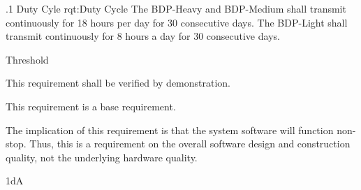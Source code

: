 \ONERQMTV
{\RqtNumberBase.1}
{Duty Cyle}
{rqt:Duty Cycle}
{The BDP-Heavy and BDP-Medium shall transmit continuously for 18 hours per day for 30 consecutive days. The BDP-Light shall transmit continuously for 8 hours a day for 30 consecutive days.}
{
	\item [Phase 1] Threshold
}
{This requirement shall be verified by demonstration.}
{
	\item [N/A] This requirement is a base requirement.
}
{
	\item The implication of this requirement is that the system software will function non-stop. Thus, this is a requirement on the overall software design and construction quality, not the underlying hardware quality.
}
{1dA}

